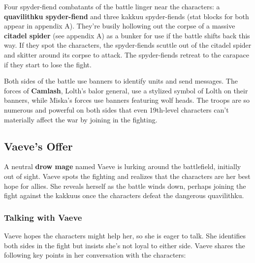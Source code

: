 \documentclass[10pt,a4paper,twoside,bg=print,twocolumn,openany,nodeprecatedcode]{dndbook}
\begin{document}
Four spyder-fiend combatants of the battle linger near the characters: a \textbf{quavilithku spyder-fiend} and three kakkuu spyder-fiends (stat blocks for both appear in appendix A). They're busily hollowing out the corpse of a massive \textbf{citadel spider} (see appendix A) as a bunker for use if the battle shifts back this way. If they spot the characters, the spyder-fiends scuttle out of the citadel spider and skitter around its corpse to attack. The spyder-fiends retreat to the carapace if they start to lose the fight.

Both sides of the battle use banners to identify units and send messages. The forces of \textbf{Camlash}, Lolth's balor general, use a stylized symbol of Lolth on their banners, while Miska's forces use banners featuring wolf heads. The troops are so numerous and powerful on both sides that even 19th-level characters can't materially affect the war by joining in the fighting.

\subsection{Vaeve's Offer}
A neutral \textbf{drow mage} named Vaeve is lurking around the battlefield, initially out of sight. Vaeve spots the fighting and realizes that the characters are her best hope for allies. She reveals herself as the battle winds down, perhaps joining the fight against the kakkuus once the characters defeat the dangerous quavilithku.

\subsubsection{Talking with Vaeve}
Vaeve hopes the characters might help her, so she is eager to talk. She identifies both sides in the fight but insists she's not loyal to either side. Vaeve shares the following key points in her conversation with the characters:
\end{document}
